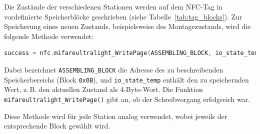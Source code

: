 Die Zustände der verschiedenen Stationen werden auf dem NFC-Tag in vordefinierte Speicherblöcke geschrieben (siehe Tabelle~\ref{tab:tag_blocks}). Zur Speicherung eines neuen Zustands, beispielsweise des Montagezustands, wird die folgende Methode verwendet:

\begin{lstlisting}[language=C++, caption={Speicherung eines Zustands im Speicherblock \texttt{ASSEMBLING\_BLOCK}}, label={lst:nfc_write}]
	success = nfc.mifareultralight_WritePage(ASSEMBLING_BLOCK, io_state_temp);
\end{lstlisting}

Dabei bezeichnet \texttt{ASSEMBLING\_BLOCK} die Adresse des zu beschreibenden Speicherbereichs (Block \texttt{0x0B}), und \texttt{io\_state\_temp} enthält den zu speichernden Wert, z.\,B. den aktuellen Zustand als 4-Byte-Wort. Die Funktion \texttt{mifareultralight\_WritePage()} gibt an, ob der Schreibvorgang erfolgreich war.

Diese Methode wird für jede Station analog verwendet, wobei jeweils der entsprechende Block gewählt wird.


